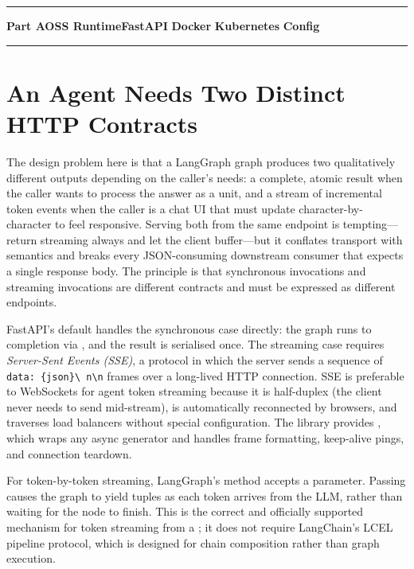 \noindent\rule{\linewidth}{0.8pt}
\begin{center}
  \textbf{Part A\quad OSS Runtime\quad FastAPI\,\textperiodcentered\,Docker\,\textperiodcentered\,Kubernetes\,\textperiodcentered\,Config}
\end{center}
\noindent\rule{\linewidth}{0.8pt}

\section{An Agent Needs Two Distinct HTTP Contracts}
\label{sec:serving-contract}

The design problem here is that a LangGraph graph produces two qualitatively
different outputs depending on the caller's needs: a complete, atomic result
when the caller wants to process the answer as a unit, and a stream of
incremental token events when the caller is a chat UI that must update
character-by-character to feel responsive. Serving both from the same
endpoint is tempting---return streaming always and let the client
buffer---but it conflates transport with semantics and breaks every
JSON-consuming downstream consumer that expects a single response body.
The principle is that synchronous invocations and streaming invocations are
different contracts and must be expressed as different endpoints.

FastAPI's default  handles the synchronous case directly:
the graph runs to completion via , and the result is serialised
once. The streaming case requires \emph{Server-Sent Events (SSE)}, a protocol
in which the server sends a sequence of \texttt{data: \{json\}\textbackslash
n\textbackslash n} frames over a long-lived HTTP connection. SSE is
preferable to WebSockets for agent token streaming because it is
half-duplex (the client never needs to send mid-stream), is automatically
reconnected by browsers, and traverses load balancers without special
configuration. The  library provides
, which wraps any async generator and handles
frame formatting, keep-alive pings, and connection teardown.

For token-by-token streaming, LangGraph's  method accepts a
 parameter. Passing  causes
the graph to yield  tuples as each token
arrives from the LLM, rather than waiting for the node to finish. This is the
correct and officially supported mechanism for token streaming from a
; it does not require LangChain's LCEL
 pipeline protocol, which is designed for chain
composition rather than graph execution.

